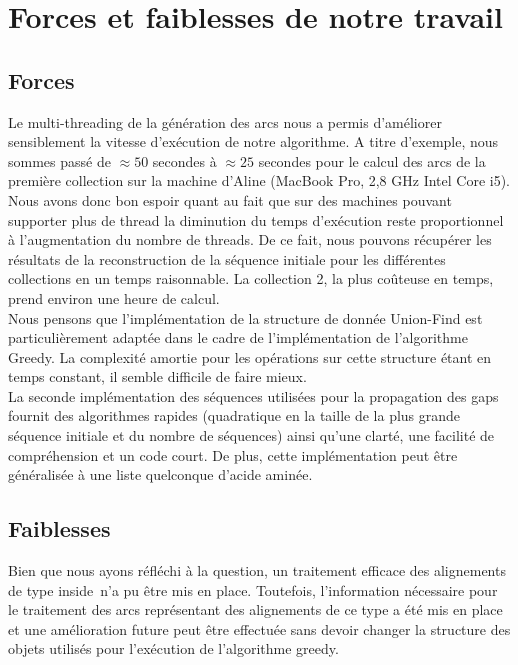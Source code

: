 
\section{Forces et faiblesses de notre travail}

\subsection{Forces}

Le multi-threading de la génération des arcs nous a permis d'améliorer sensiblement la vitesse d'exécution de notre algorithme. A titre d'exemple, nous sommes passé de $\approx 50$ secondes à $\approx 25$ secondes pour le calcul des arcs de la première collection sur la machine d'Aline (MacBook Pro, 2,8 GHz Intel Core i5). Nous avons donc bon espoir quant au fait que sur des machines pouvant supporter plus de thread la diminution du temps d'exécution reste proportionnel à l'augmentation du nombre de threads. De ce fait, nous pouvons récupérer les résultats de la reconstruction de la séquence initiale pour les différentes collections en un temps raisonnable. La collection 2, la plus coûteuse en temps, prend environ une heure de calcul.\\

Nous pensons que l'implémentation de la structure de donnée Union-Find est particulièrement adaptée dans le cadre de l'implémentation de l'algorithme Greedy. La complexité amortie pour les opérations sur cette structure étant en temps constant, il semble difficile de faire mieux.\\

La seconde implémentation des séquences utilisées pour la propagation des gaps
fournit des algorithmes rapides (quadratique en la taille de la plus grande séquence initiale et
du nombre de séquences) ainsi qu'une clarté, une facilité de compréhension et un
code court. De plus, cette
implémentation peut être généralisée à une liste quelconque d'acide aminée.


\subsection{Faiblesses}

Bien que nous ayons réfléchi à la question, un traitement efficace des alignements de type \og inside\fg~n'a pu être mis en place. Toutefois, l'information nécessaire pour le traitement des arcs représentant des alignements de ce type a été mis en place et une amélioration future peut être effectuée sans devoir changer la structure des objets utilisés pour l'exécution de l'algorithme greedy.

